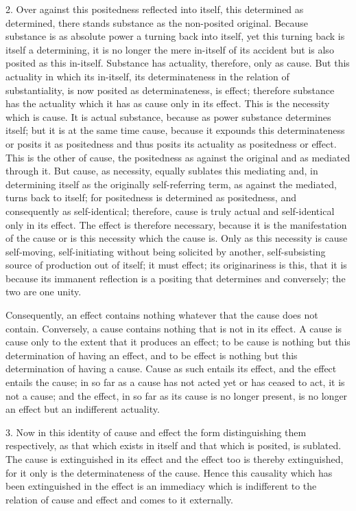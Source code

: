 2. Over against this positedness reflected into itself,
this determined as determined,
there stands substance as the non-posited original.
Because substance is as absolute power
a turning back into itself,
yet this turning back is itself a determining,
it is no longer the mere in-itself of its accident
but is also posited as this in-itself.
Substance has actuality, therefore, only as cause.
But this actuality in which its in-itself,
its determinateness in the relation of substantiality,
is now posited as determinateness, is effect;
therefore substance has the actuality
which it has as cause only in its effect.
This is the necessity which is cause.
It is actual substance,
because as power substance determines itself;
but it is at the same time cause,
because it expounds this determinateness
or posits it as positedness
and thus posits its actuality
as positedness or effect.
This is the other of cause,
the positedness as against the original
and as mediated through it.
But cause, as necessity,
equally sublates this mediating and,
in determining itself as the originally
self-referring term, as against the mediated,
turns back to itself;
for positedness is determined as positedness,
and consequently as self-identical;
therefore, cause is truly actual and self-identical
only in its effect.
The effect is therefore necessary,
because it is the manifestation of the cause
or is this necessity which the cause is.
Only as this necessity is cause self-moving,
self-initiating without being solicited by another,
self-subsisting source of production out of itself;
it must effect;
its originariness is this,
that it is because its immanent reflection
is a positing that determines and conversely;
the two are one unity.

Consequently, an effect contains nothing whatever
that the cause does not contain.
Conversely, a cause contains nothing
that is not in its effect.
A cause is cause only to the extent
that it produces an effect;
to be cause is nothing but
this determination of having an effect,
and to be effect is nothing but
this determination of having a cause.
Cause as such entails its effect,
and the effect entails the cause;
in so far as a cause has not acted yet
or has ceased to act,
it is not a cause;
and the effect, in so far as
its cause is no longer present,
is no longer an effect
but an indifferent actuality.

3. Now in this identity of cause and effect
the form distinguishing them respectively,
as that which exists in itself
and that which is posited,
is sublated.
The cause is extinguished in its effect
and the effect too is thereby extinguished,
for it only is the determinateness of the cause.
Hence this causality which has been extinguished
in the effect is an immediacy
which is indifferent to the relation of cause and effect
and comes to it externally.

